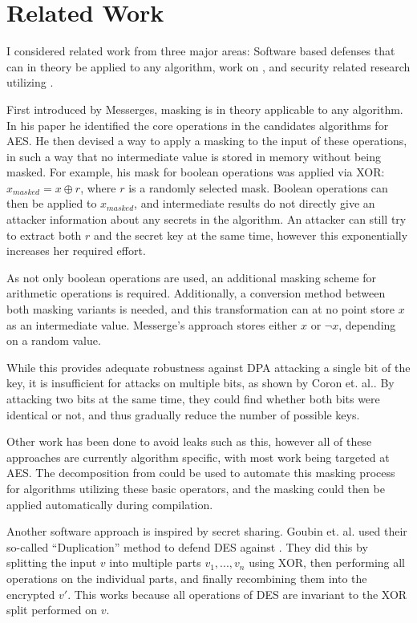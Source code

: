 \section{Related Work}
\label{related}
I considered related work from three major areas:
Software based \poweranalysis{} defenses that can in theory be applied to any algorithm, work on \dual{}, and security related research utilizing \llvm{}.

First introduced by Messerges\cite{messerges2000securing}, masking is in theory applicable to any algorithm.
In his paper he identified the core operations in the candidates algorithms for AES.
He then devised a way to apply a masking to the input of these operations, in such a way that no intermediate value is stored in memory without being masked.
For example, his mask for boolean operations was applied via XOR: $x_{masked} = x \oplus r$, where $r$ is a randomly selected mask.
Boolean operations can then be applied to $x_{masked}$, and intermediate results do not directly give an attacker information about any secrets in the algorithm.
An attacker can still try to extract both $r$ and the secret key at the same time, however this exponentially increases her required effort.

As not only boolean operations are used, an additional masking scheme for arithmetic operations is required.
Additionally, a conversion method between both masking variants is needed, and this transformation can at no point store $x$ as an intermediate value.
Messerge's approach stores either $x$ or $\neg{x}$, depending on a random value.

While this provides adequate robustness against DPA attacking a single bit of the key, it is insufficient for attacks on multiple bits, as shown by Coron et. al.\cite{coron2000boolean}.
By attacking two bits at the same time, they could find whether both bits were identical or not, and thus gradually reduce the number of possible keys.

Other work has been done to avoid leaks such as this\cite{akkar2001implementation}\cite{rivain2010provably}, however all of these approaches are currently algorithm specific, with most work being targeted at AES.
The decomposition from \cite{messerges2000securing} could be used to automate this masking process for algorithms utilizing these basic operators, and the masking could then be applied automatically during compilation.

Another software approach is inspired by secret sharing.
Goubin et. al.\cite{goubin1999and} used their so-called ``Duplication'' method to defend DES against \poweranalysis{}.
They did this by splitting the input $v$ into multiple parts $v_1, ..., v_n$ using XOR, then performing all operations on the individual parts, and finally recombining them into the encrypted $v'$.
This works because all operations of DES are invariant to the XOR split performed on $v$.

